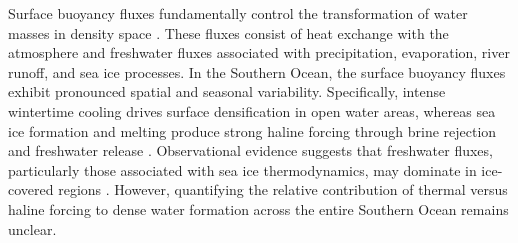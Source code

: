 \documentclass[pdflatex,sn-nature]{sn-jnl}
\begin{document}
Surface buoyancy fluxes fundamentally control the transformation of water masses in density space \cite{Walin1982,Speer1992,drake2025water}. These fluxes consist of heat exchange with the atmosphere and freshwater fluxes associated with precipitation, evaporation, river runoff, and sea ice processes. In the Southern Ocean, the surface buoyancy fluxes exhibit pronounced spatial and seasonal variability. Specifically, intense wintertime cooling drives surface densification in open water areas, whereas sea ice formation and melting produce strong haline forcing through brine rejection and freshwater release \cite{Abernathey2016,Pellichero2018}. Observational evidence suggests that freshwater fluxes, particularly those associated with sea ice thermodynamics, may dominate in ice-covered regions \cite{Pellichero2018,Bailey2023}. However, quantifying the relative contribution of thermal versus haline forcing to dense water formation across the entire Southern Ocean remains unclear.



\end{document}
